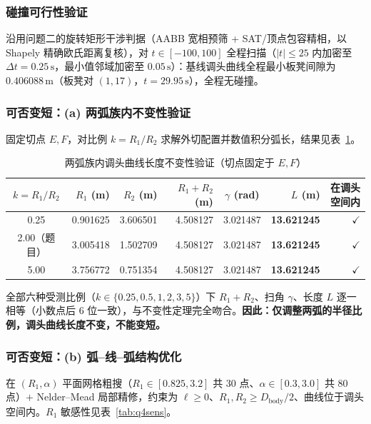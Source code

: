 ﻿\documentclass{cumcmthesis}
\begin{document}
\subsubsection{碰撞可行性验证}
沿用问题二的旋转矩形干涉判据（AABB 宽相预筛 + SAT/顶点包容精相，以 Shapely 精确欧氏距离复核），对 $t\in[-100,100]$ 全程扫描（$|t|\le25$ 内加密至 $\Delta t=0.25\,\text{s}$，最小值邻域加密至 $0.05\,\text{s}$）：基线调头曲线全程最小板凳间隙为 $0.406088\,\text{m}$（板凳对 $(1,17)$，$t=29.95\,\text{s}$），全程无碰撞。

\subsubsection{可否变短：(a) 两弧族内不变性验证}
固定切点 $E,F$，对比例 $k=R_1/R_2$ 求解外切配置并数值积分弧长，结果见表~\ref{tab:q4invar}。

\begin{table}[H]
\centering
\caption{两弧族内调头曲线长度不变性验证（切点固定于 $E,F$）}
\label{tab:q4invar}
\footnotesize\setlength{\tabcolsep}{5pt}
\renewcommand{\arraystretch}{1.12}
\begin{tabular}{crrrcrr}
\toprule
$k=R_1/R_2$ & $R_1$ (m) & $R_2$ (m) & $R_1+R_2$ (m) & $\gamma$ (rad) & $L$ (m) & 在调头空间内 \\
\midrule
0.25 & 0.901625 & 3.606501 & 4.508127 & 3.021487 & \textbf{13.621245} & $\checkmark$ \\
2.00（题目） & 3.005418 & 1.502709 & 4.508127 & 3.021487 & \textbf{13.621245} & $\checkmark$ \\
5.00 & 3.756772 & 0.751354 & 4.508127 & 3.021487 & \textbf{13.621245} & $\checkmark$ \\
\bottomrule
\end{tabular}
\end{table}

全部六种受测比例（$k\in\{0.25,0.5,1,2,3,5\}$）下 $R_1+R_2$、扫角 $\gamma$、长度 $L$ 逐一相等（小数点后 6 位一致），与不变性定理完全吻合。\textbf{因此：仅调整两弧的半径比例，调头曲线长度不变，不能变短。}

\subsubsection{可否变短：(b) 弧–线–弧结构优化}
在 $(R_1,\alpha)$ 平面网格粗搜（$R_1\in[0.825,3.2]$ 共 30 点、$\alpha\in[0.3,3.0]$ 共 80 点）$+$ Nelder–Mead 局部精修，约束为 $\ell\ge0$、$R_1,R_2\ge D_{\text{body}}/2$、曲线位于调头空间内。$R_1$ 敏感性见表~\ref{tab:q4sens}。
\end{document}
